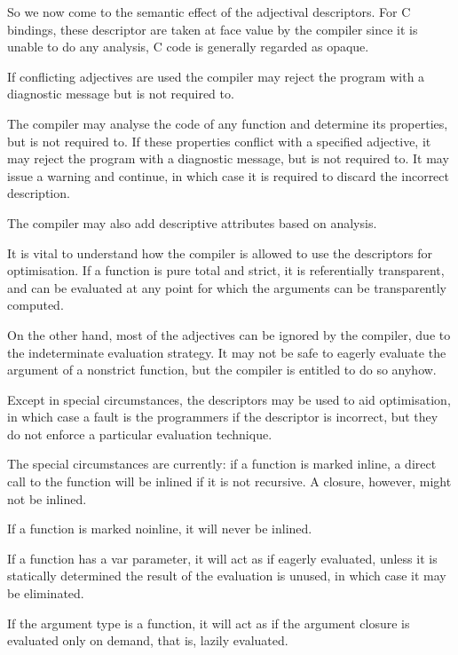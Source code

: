 \documentclass{article}
\begin{document}
So we now come to the semantic effect of the adjectival
descriptors. For C bindings, these descriptor are taken
at face value by the compiler since it is unable to do
any analysis, C code is generally regarded as opaque.

If conflicting adjectives are used the compiler may
reject the program with a diagnostic message but is
not required to.

The compiler may analyse the code of any function
and determine its properties, but is not required to.
If these properties conflict with a specified adjective,
it may reject the program with a diagnostic message,
but is not required to. It may issue a warning and 
continue, in which case it is required to discard
the incorrect description.

The compiler may also add descriptive attributes based
on analysis. 

It is vital to understand how the compiler is allowed
to use the descriptors for optimisation. If a function
is pure total and strict, it is referentially transparent,
and can be evaluated at any point for which the arguments
can be transparently computed.

On the other hand, most of the adjectives can be ignored
by the compiler, due to the indeterminate evaluation
strategy. It may not be safe to eagerly evaluate the
argument of a nonstrict function, but the compiler is
entitled to do so anyhow. 

Except in special circumstances,
the descriptors may be used to aid optimisation,
in which case a fault is the programmers if the descriptor
is incorrect, but they do not enforce a particular evaluation
technique. 

The special circumstances are currently: if a function
is marked inline, a direct call to the function will be inlined
if it is not recursive. A closure, however, might not be inlined.

If a function is marked noinline, it will never be inlined.

If a function has a var parameter, it will act as if eagerly
evaluated, unless it is statically determined the result
of the evaluation is unused, in which case it may be eliminated.

If the argument type is a function, it will
act as if the argument closure is evaluated only on demand,
that is, lazily evaluated.
\end{document}
